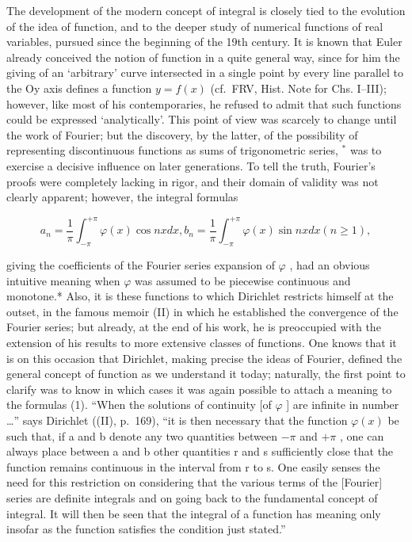 The development of the modern concept of integral is closely tied to the evolution of the idea of function, and to the deeper study of numerical functions of real variables, pursued since the beginning of the 19th century. It is known that Euler already conceived the notion of function in a quite general way, since for him the giving of an `arbitrary' curve intersected in a single point by every line parallel to the Oy axis defines a function \(y = f(x)\) (cf.~FRV, Hist. Note for Chs. I--III); however, like most of his contemporaries, he refused to admit that such functions could be expressed `analytically'. This point of view was scarcely to change until the work of Fourier; but the discovery, by the latter, of the possibility of representing discontinuous functions as sums of trigonometric series, \(^{*}\) was to exercise a decisive influence on later generations. To tell the truth, Fourier's proofs were completely lacking in rigor, and their domain of validity was not clearly apparent; however, the integral formulas

\[
a _ {n} = \frac {1}{\pi} \int_ {- \pi} ^ {+ \pi} \varphi (x) \cos n x d x, b _ {n} = \frac {1}{\pi} \int_ {- \pi} ^ {+ \pi} \varphi (x) \sin n x d x (n \geqslant 1),\tag{1}
\]

giving the coefficients of the Fourier series expansion of \(\varphi\) , had an obvious intuitive meaning when \(\varphi\) was assumed to be piecewise continuous and monotone.* Also, it is these functions to which Dirichlet restricts himself at the outset, in the famous memoir (II) in which he established the convergence of the Fourier series; but already, at the end of his work, he is preoccupied with the extension of his results to more extensive classes of functions. One knows that it is on this occasion that Dirichlet, making precise the ideas of Fourier, defined the general concept of function as we understand it today; naturally, the first point to clarify was to know in which cases it was again possible to attach a meaning to the formulas (1). ``When the solutions of continuity {[}of \(\varphi\) {]} are infinite in number \ldots'' says Dirichlet ((II), p.~169), ``it is then necessary that the function \(\varphi(x)\) be such that, if a and b denote any two quantities between \(-\pi\) and \(+\pi\) , one can always place between a and b other quantities r and s sufficiently close that the function remains continuous in the interval from r to s. One easily senses the need for this restriction on considering that the various terms of the {[}Fourier{]} series are definite integrals and on going back to the fundamental concept of integral. It will then be seen that the integral of a function has meaning only insofar as the function satisfies the condition just stated.''

